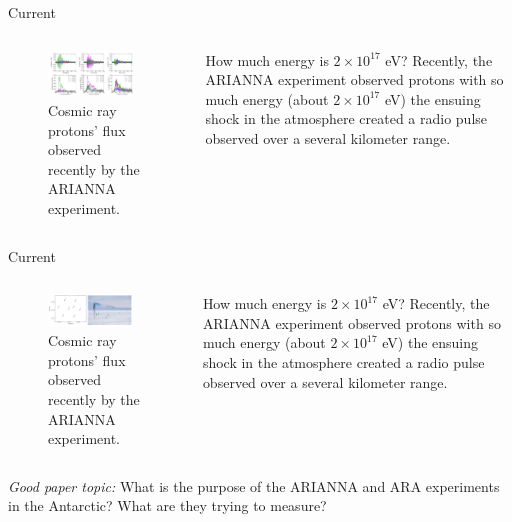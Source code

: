 \documentclass{beamer}
\begin{document}
\begin{frame}{Current}
\begin{columns}[T]
\begin{column}{0.5\textwidth}
\begin{figure}
\centering
\includegraphics[width=0.9\textwidth]{figures/ARIANNA2.png}
\caption{\label{fig:ARIANNA2} Cosmic ray protons' flux observed recently by the ARIANNA experiment.}
\end{figure}
\end{column}
\begin{column}{0.5\textwidth}
\small
How much energy is $2 \times 10^{17}$ eV?  Recently, the ARIANNA experiment observed protons with so much energy (about $2 \times 10^{17}$ eV) the ensuing shock in the atmosphere created a radio pulse observed over a several kilometer range.
\end{column}
\end{columns}
\end{frame}

\begin{frame}{Current}
\begin{columns}[T]
\begin{column}{0.5\textwidth}
\begin{figure}
\centering
\includegraphics[width=0.9\textwidth]{figures/ARIANNA3.png}
\caption{\label{fig:ARIANNA3} Cosmic ray protons' flux observed recently by the ARIANNA experiment.}
\end{figure}
\end{column}
\begin{column}{0.5\textwidth}
\small
How much energy is $2 \times 10^{17}$ eV?  Recently, the ARIANNA experiment observed protons with so much energy (about $2 \times 10^{17}$ eV) the ensuing shock in the atmosphere created a radio pulse observed over a several kilometer range.
\end{column}
\end{columns}
\textit{Good paper topic:} What is the purpose of the ARIANNA and ARA experiments in the Antarctic?  What are they trying to measure?
\end{frame}
\end{document}

